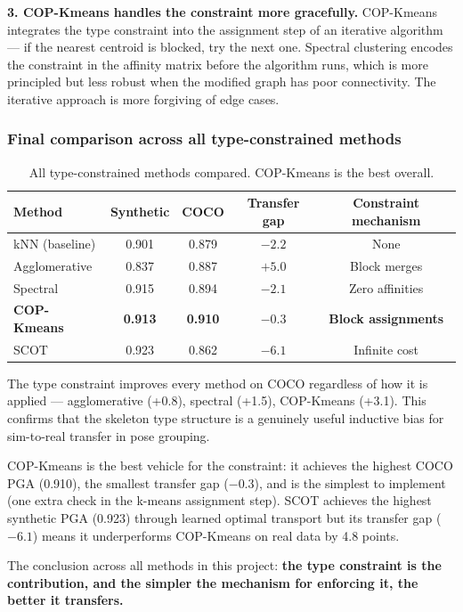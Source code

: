 \textbf{3. COP-Kmeans handles the constraint more gracefully.} COP-Kmeans integrates the type constraint into the assignment step of an iterative algorithm --- if the nearest centroid is blocked, try the next one. Spectral clustering encodes the constraint in the affinity matrix before the algorithm runs, which is more principled but less robust when the modified graph has poor connectivity. The iterative approach is more forgiving of edge cases.


\subsubsection{Final comparison across all type-constrained methods}

\begin{table}[H]
\centering
\footnotesize
\begin{tabular}{lcccc}
\toprule
Method & Synthetic & COCO & Transfer gap & Constraint mechanism \\
\midrule
kNN (baseline) & 0.901 & 0.879 & $-2.2$ & None \\
Agglomerative & 0.837 & 0.887 & $+5.0$ & Block merges \\
Spectral & 0.915 & 0.894 & $-2.1$ & Zero affinities \\
\textbf{COP-Kmeans} & \textbf{0.913} & \textbf{0.910} & $\mathbf{-0.3}$ & \textbf{Block assignments} \\
SCOT & 0.923 & 0.862 & $-6.1$ & Infinite cost \\
\bottomrule
\end{tabular}
\caption{All type-constrained methods compared. COP-Kmeans is the best overall.}
\end{table}

The type constraint improves every method on COCO regardless of how it is applied --- agglomerative (+0.8), spectral (+1.5), COP-Kmeans (+3.1). This confirms that the skeleton type structure is a genuinely useful inductive bias for sim-to-real transfer in pose grouping.

COP-Kmeans is the best vehicle for the constraint: it achieves the highest COCO PGA (0.910), the smallest transfer gap ($-0.3$), and is the simplest to implement (one extra check in the k-means assignment step). SCOT achieves the highest synthetic PGA (0.923) through learned optimal transport but its transfer gap ($-6.1$) means it underperforms COP-Kmeans on real data by 4.8 points.

The conclusion across all methods in this project: \textbf{the type constraint is the contribution, and the simpler the mechanism for enforcing it, the better it transfers.}


